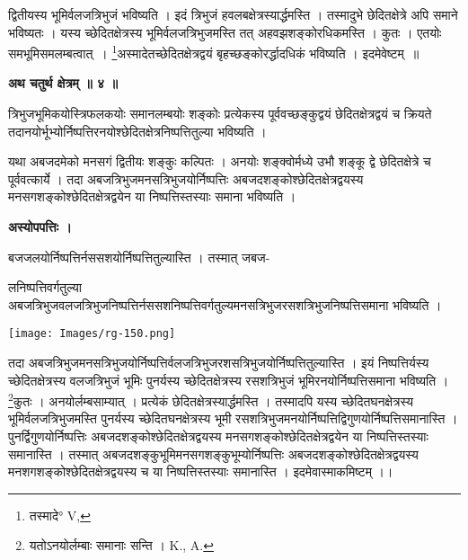 \documentclass[11pt, openany]{book}
\begin{document}
\noindent  द्वितीयस्य भूमिर्वलजत्रिभुजं भविष्यति ।  इदं त्रिभुजं हवलबक्षेत्रस्यार्द्धमस्ति । तस्मादुभे छेदितक्षेत्रे अपि समाने भविष्यतः । यस्य
च्छेदितक्षेत्रस्य भूमिर्वलजत्रिभुजमस्ति तत् अहवझशङ्कोरधिकमस्ति । कुतः । एतयोः समभूमिसमलम्बत्वात्~। \renewcommand{\thefootnote}{२}\footnote{तस्मादे° {\en V,}}अस्मादेतच्छेदितक्षेत्रद्वयं बृहच्छङ्कोरर्द्धादधिकं भविष्यति । इदमेवेष्टम्~॥\\
\begin{center}
\textbf{\large अथ चतुर्थ क्षेत्रम् ॥ ४ ॥}
\end{center}
\vspace{3mm}

{\ab त्रिभुजभूमिकयोस्त्रिफलकयोः समानलम्बयोः शङ्कोः प्रत्येकस्य पूर्ववच्छङ्कुद्वयं छेदितक्षेत्रद्वयं च क्रियते तदानयोर्भूभ्योर्निष्पत्तिरनयोश्छेदितक्षेत्रनिष्पत्तितुल्या भविष्यति ।}\\
\vspace{5mm}

 यथा अबजदमेको मनसगं द्वितीयः शङ्कुः कल्पितः । अनयोः शङ्क्वोर्मध्ये उभौ शङ्कू द्वे छेदितक्षेत्रे च पूर्ववत्कार्ये । तदा अबजत्रिभुजमनसत्रिभुजयोर्निष्पत्तिः अबजदशङ्कोश्छेदितक्षेत्रद्वयस्य
मनसगशङ्कोश्छेदितक्षेत्रद्वयेन या निष्पत्तिस्तस्याः समाना भविष्यति ।\\
\begin{center}
\textbf{अस्योपपत्तिः ।}
\end{center}
\vspace{3mm}

बजजलयोर्निष्पत्तिर्नससशयोर्निष्पत्तितुल्यास्ति । तस्मात् जबज-

\newpage

\noindent लनिष्पत्तिवर्गतुल्या
अबजत्रिभुजवलजत्रिभुजनिष्पत्तिर्नससशनिष्पत्तिवर्गतुल्यमनसत्रिभुजरसशत्रिभुजनिष्पत्तिसमाना भविष्यति । \\
\begin{center}
\texttt{[image: Images/rg-150.png]}  
\end{center}

 तदा अबजत्रिभुजमनसत्रिभुजयोर्निष्पत्तिर्वलजत्रिभुजरशसत्रिभुजयोर्निष्पत्तितुल्यास्ति । इयं निष्पत्तिर्यस्य च्छेदितक्षेत्रस्य वलजत्रिभुजं भूमिः पुनर्यस्य च्छेदितक्षेत्रस्य रसशत्रिभुजं भूमिरनयोर्निष्पत्तिसमाना
भविष्यति । \renewcommand{\thefootnote}{१}\footnote{यतोऽनयोर्लम्बाः समानाः सन्ति । {\en K., A.}}कुतः । अनयोर्लम्बसाम्यात् । प्रत्येकं छेदितक्षेत्रस्यार्द्धमस्ति । तस्मादपि यस्य च्छेदितघनक्षेत्रस्य भूमिर्वलजत्रिभुजमस्ति पुनर्यस्य च्छेदितघनक्षेत्रस्य भूमी रसशत्रिभुजमनयोर्निष्पत्तिद्विगुणयोर्निष्पत्तिसमानास्ति । पुनर्द्विगुणयोर्निष्पत्तिः अबजदशङ्कोश्छेदितक्षेत्रद्वयस्य मनसगशङ्कोश्छेदितक्षेत्रद्वयेन या निष्पत्तिस्तस्याः समानास्ति ।
तस्मात् अबजदशङ्कुभूमिमनसगशङ्कुभूम्योर्निष्पत्तिः अबजदशङ्कोश्छेदितक्षेत्रद्वयस्य मनशगशङ्कोश्छेदितक्षेत्रद्वयस्य च या निष्पत्तिस्तस्याः समानास्ति । इदमेवास्माकमिष्टम् ।। \\
\vspace{5mm}
\end{document}
